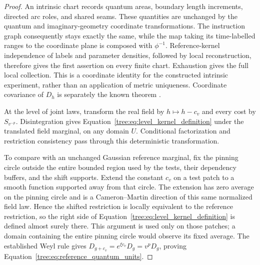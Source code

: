 \begin{proof}
An intrinsic chart records quantum areas, boundary length increments,
directed arc roles, and shared seams.  These quantities are unchanged
by the quantum and imaginary-geometry coordinate transformations.
The instruction graph consequently stays exactly the same, while
the map taking its time-labelled ranges to the coordinate plane is
composed with $\phi^{-1}$.  Reference-kernel independence of labels
and parameter densities, followed by local reconstruction, therefore
gives the first assertion on every finite chart.  Exhaustion gives
the full local collection.  This is a coordinate identity for the
constructed intrinsic experiment, rather than an application of
metric uniqueness.  Coordinate covariance of $D_h$ is separately
the known theorem \cite[Theorem~1.3]{GwynneMillerConformal}.

At the level of joint laws, transform the real field by $h\mapsto h-c_v$
and every cost by $S_{v^{-p}}$. Disintegration gives
Equation~\eqref{tree:eq:level_kernel_definition} under the translated
field marginal, on any domain $U$. Conditional factorization and
restriction consistency pass through this deterministic transformation.

To compare with an unchanged Gaussian reference marginal, fix the
pinning circle outside the entire bounded region used by the tests,
their dependency buffers, and the shift supports. Extend the constant
$c_v$ on a test patch to a smooth function supported away from that
circle. The extension has zero average on the pinning circle and is
a Cameron--Martin direction of this same normalized field law. Hence
the shifted restriction is locally equivalent to the reference
restriction, so the right side of
Equation~\eqref{tree:eq:level_kernel_definition} is defined almost surely
there. This argument is used only on those patches; a domain containing
the entire pinning circle would observe its fixed average. The
established Weyl rule gives
$D_{g+c_v}=e^{\xi c_v}D_g=v^pD_g$, proving
Equation~\eqref{tree:eq:reference_quantum_units}.


\end{proof}
